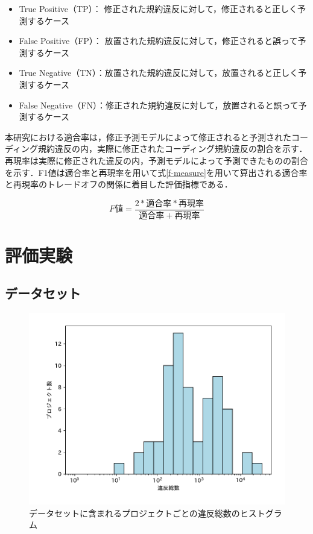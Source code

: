 \documentclass[11pt,dvipdfmx]{jreport}
\begin{document}
\begin{itemize}
\item True Positive（TP）： 修正された規約違反に対して，修正されると正しく予測するケース
\item False Positive（FP）： 放置された規約違反に対して，修正されると誤って予測するケース
\item True Negative（TN）：放置された規約違反に対して，放置されると正しく予測するケース
\item False Negative（FN）：修正された規約違反に対して，放置されると誤って予測するケース
\end{itemize}

本研究における適合率は，修正予測モデルによって修正されると予測されたコーディング規約違反の内，実際に修正されたコーディング規約違反の割合を示す．再現率は実際に修正された違反の内，予測モデルによって予測できたものの割合を示す．F1値は適合率と再現率を用いて式\ref{f-measure}を用いて算出される適合率と再現率のトレードオフの関係に着目した評価指標である．

\begin{equation}
  F値 = \frac{2 * 適合率 * 再現率}{適合率 + 再現率} \label{f-measure}
\end{equation}

\chapter{評価実験}\label{chap:result}

\section{データセット}

\begin{figure}[tbp]
	\centering
	\includegraphics[width=0.7\linewidth]{Kameoka_fig/dataset_hist.pdf}
	\caption{データセットに含まれるプロジェクトごとの違反総数のヒストグラム}
	\label{fig:dataset}
\end{figure}
\end{document}
